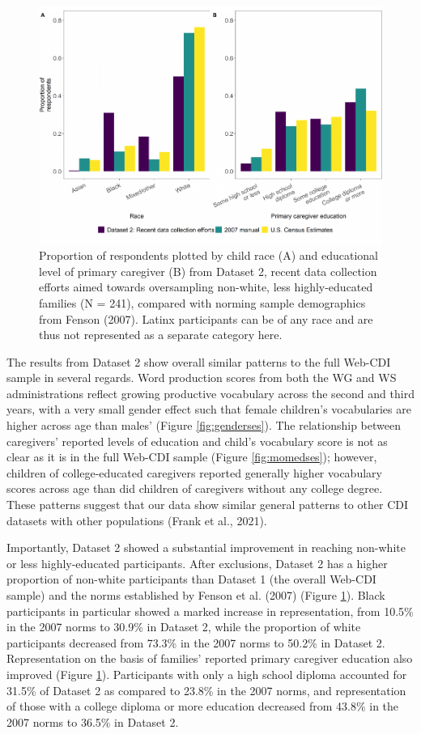 \documentclass[
  english,
  ,man,floatsintext]{apa6}
\begin{document}
\begin{figure}
\centering
\includegraphics{webcdi_paper_files/figure-latex/demobarses-1.pdf}
\caption{\label{fig:demobarses}Proportion of respondents plotted by child race (A) and educational level of primary caregiver (B) from Dataset 2, recent data collection efforts aimed towards oversampling non-white, less highly-educated families (N = 241), compared with norming sample demographics from Fenson (2007). Latinx participants can be of any race and are thus not represented as a separate category here.}
\end{figure}

The results from Dataset 2 show overall similar patterns to the full Web-CDI sample in several regards. Word production scores from both the WG and WS administrations reflect growing productive vocabulary across the second and third years, with a very small gender effect such that female children's vocabularies are higher across age than males' (Figure \ref{fig:genderses}). The relationship between caregivers' reported levels of education and child's vocabulary score is not as clear as it is in the full Web-CDI sample (Figure \ref{fig:momedses}); however, children of college-educated caregivers reported generally higher vocabulary scores across age than did children of caregivers without any college degree. These patterns suggest that our data show similar general patterns to other CDI datasets with other populations (Frank et al., 2021).

Importantly, Dataset 2 showed a substantial improvement in reaching non-white or less highly-educated participants. After exclusions, Dataset 2 has a higher proportion of non-white participants than Dataset 1 (the overall Web-CDI sample) and the norms established by Fenson et al. (2007) (Figure \ref{fig:demobarses}). Black participants in particular showed a marked increase in representation, from 10.5\% in the 2007 norms to 30.9\% in Dataset 2, while the proportion of white participants decreased from 73.3\% in the 2007 norms to 50.2\% in Dataset 2. Representation on the basis of families' reported primary caregiver education also improved (Figure \ref{fig:demobarses}). Participants with only a high school diploma accounted for 31.5\% of Dataset 2 as compared to 23.8\% in the 2007 norms, and representation of those with a college diploma or more education decreased from 43.8\% in the 2007 norms to 36.5\% in Dataset 2.
\end{document}
